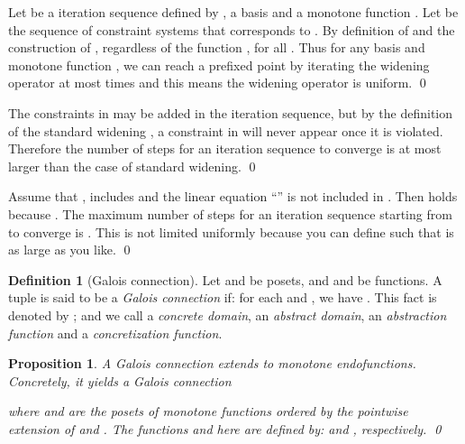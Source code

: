 \documentclass[envcountsect,orivec]{llncs} \pdfoutput=1
\newtheorem{myprop}[mythm]{Proposition}
\theoremstyle{definition}
\newtheorem{mydef}[mythm]{Definition}
\def\myqed{\qed}
\begin{document}
       \begin{myproof}
	Let  be a iteration sequence defined by , a basis  and a monotone function .
Let  be the sequence of constraint systems that corresponds to .
	By definition of  and the construction of , regardless of the function ,  for all .
	Thus for any basis  and monotone function , we can reach a prefixed point by iterating the widening operator at most  times and this means the widening operator  is uniform.
\myqed
       \end{myproof}



        \begin{myproof}
	 The constraints in  may be added in the iteration sequence, but by the definition of the standard widening , a constraint in  will never appear once it is violated.
	 Therefore the number of steps for an iteration sequence to converge is at most  larger than the case of standard widening.
\myqed
	\end{myproof}





       \begin{myproof}
	Assume that ,  includes  and the linear equation ``'' is not included in .
	Then  holds because .
	The maximum number of steps for an iteration sequence starting from  to converge is .
	This is not limited uniformly because you can define  such that  is as large as you like.
\myqed
       \end{myproof}




 
















\begin{mydef}[Galois connection]\label{def:galois}
 Let  and  be posets, and
 and  be functions.
 A tuple  is said to be
 a \emph{Galois connection} if: for each  and
 , we have 
 .
This fact is denoted by  ;
 and we call  a \emph{concrete domain},  an
 \emph{abstract domain},  an \emph{abstraction function} and
  a \emph{concretization function}.
\end{mydef}
\begin{myprop}\label{prop:galoisExtendsToFuncSp}
A Galois connection  extends to monotone
 endofunctions. Concretely, it yields a Galois connection
 
where  and
  are
 the posets of monotone functions ordered by the pointwise extension of
  and . The functions 
 and  here are defined by:  and , respectively.
\myqed
\end{myprop}
\end{document}
